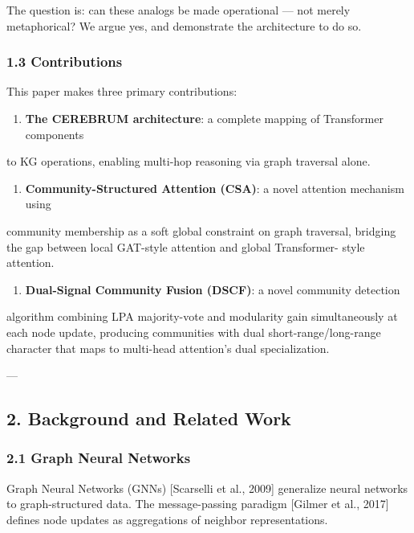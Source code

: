 \documentclass[10pt,journal,compsoc]{IEEEtran}
\begin{document}
The question is: can these analogs be made operational — not merely
metap\-horical? We argue yes, and demonstrate the archi\-tecture to do so.

\subsubsection{1.3 Contri\-butions}

This paper makes three primary contr\-ibutions:

\begin{enumerate}
\item \textbf{The CEREBRUM archi\-tecture}: a complete mapping of Transformer components
\end{enumerate}
   to KG operations, enabling multi-hop reasoning via graph traversal alone.

\begin{enumerate}
\item \textbf{Community-Structured Attention (CSA)}: a novel attention mechanism using
\end{enumerate}
   community membership as a soft global constraint on graph traversal,
   bridging the gap between local GAT-style attention and global Transformer-
   style attention.

\begin{enumerate}
\item \textbf{Dual-Signal Community Fusion (DSCF)}: a novel community detection
\end{enumerate}
   algorithm combining LPA majority-vote and modularity gain simul\-taneously
   at each node update, producing communities with dual short-range/long-range
   character that maps to multi-head attention's dual speci\-alization.

---

\subsection{2. Background and Related Work}

\subsubsection{2.1 Graph Neural Networks}

Graph Neural Networks (GNNs) [Scarselli et al., 2009] generalize neural
networks to graph-structured data. The message-passing paradigm [Gilmer et
al., 2017] defines node updates as aggre\-gations of neighbor repre\-sentations.
\end{document}
